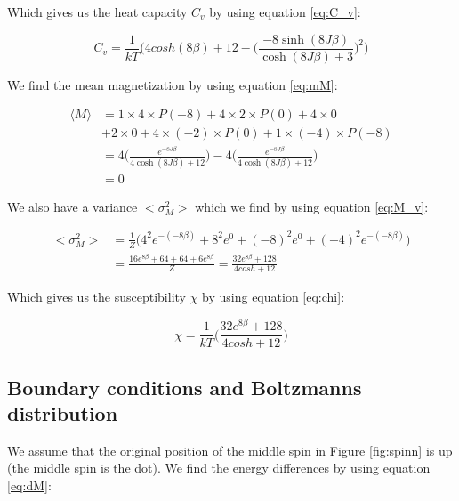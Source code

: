 \documentclass{article}
\begin{document}
Which gives us the heat capacity $C_v$ by using equation \ref{eq:C_v}:

\begin{equation}
C_v = \frac{1}{kT} \bigg({4cosh(8\beta)+12}-\bigg(\frac{-8\sinh{(8J\beta)}}{\cosh{(8J\beta)}+3}\bigg)^2\bigg)
\label{eq:calc_Cv}
\end{equation}

We find the mean magnetization by using equation \ref{eq:mM}:

\begin{equation} \label{eq:calc_M}
\begin{split}
\langle M \rangle& = 1\times 4 \times P(-8) + 4 \times 2 \times P(0) + 4 \times 0 \\
& + 2\times0+4 \times (-2) \times P(0) +  1\times(-4) \times P(-8)\\
&=4\bigg(\frac{e^{-8J\beta }}{4\cosh{(8J\beta)}+12}\bigg)-4\bigg(\frac{e^{-8J\beta }}{4\cosh{(8J\beta)}+12}\bigg) \\
&=0
\end{split}
\end{equation}

We also have a variance $<\sigma_M^2>$ which we find by using equation \ref{eq:M_v}:

\begin{equation}
\begin{split}
<\sigma_M^2>&=\frac{1}{Z}\bigg(4^2e^{-(-8\beta)}+8^2e^0+(-8)^2e^0+(-4)^2e^{-(-8\beta)}\bigg)\\
&=\frac{16e^{8\beta}+64+64+6e^{8\beta}}{Z}=\frac{32e^{8\beta}+128}{4cosh+12}
\end{split}
\label{eq:calc_Mv}
\end{equation}

Which gives us the susceptibility $\chi$ by using equation \ref{eq:chi}:

\begin{equation}
\chi = \frac{1}{kT} \bigg(\frac{32e^{8\beta}+128}{4cosh+12}\bigg)
\label{eq:calc_chi}
\end{equation}

\subsection*{Boundary conditions and Boltzmanns distribution}

We assume that the original position of the middle spin in Figure \ref{fig:spinn} is up (the middle spin is the dot). We find the energy differences by using equation \ref{eq:dM}:
\end{document}
